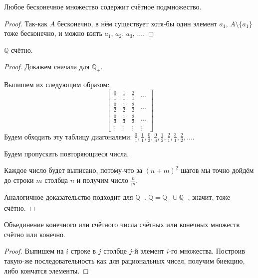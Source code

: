 \begin{lemma} \thmslashn

    Любое бесконечное множество содержит счётное подмножество.
    \begin{proof} \thmslashn
    
        Так-как $A$ бесконечно, в нём существует хотя-бы один элемент $a_1$, $A \setminus \{a_1\} $ тоже бесконечно, и можно взять $a_1$, $a_2$, $a_3$, $\ldots$. 
    \end{proof}
\end{lemma}
\begin{lemma} \thmslashn

    $\mathbb{Q}$ счётно.
    \begin{proof} \thmslashn
    
        Докажем сначала для $\mathbb{Q}_{+}$.

        Выпишем их следующим образом: \TODO
        \begin{equation*}
            \begin{bmatrix} 
                \frac{0}{1} & \frac{1}{1} & \frac{2}{1} & \ldots\\
                \frac{0}{2} & \frac{1}{2} & \frac{2}{2} & \ldots\\
                \frac{0}{3} & \frac{1}{3} & \frac{2}{3} & \ldots\\
                \vdots & \vdots & \vdots & \vdots
            \end{bmatrix} 
        \end{equation*}
        Будем обходить эту таблицу диагоналями: $\frac{0}{1}, \frac{1}{1}, \frac{0}{2}, \frac{0}{3}, \frac{1}{2}, \frac{2}{1}, \frac{3}{1}, \frac{2}{2}, \ldots$.

        Будем пропускать повторяющиеся числа.

        Каждое число будет выписано, потому-что за $(n+m)^2$ шагов мы точно дойдём до строки $m$ столбца $n$ и получим число $\frac{n}{m}$.

        Аналогичное доказательство подходит для $\mathbb{Q}_{-}$. $\mathbb{Q} = \mathbb{Q}_{+} \cup \mathbb{Q}_{-}$, значит, тоже счётно.
    \end{proof}
\end{lemma}
\begin{lemma} \thmslashn

    Объединение конечного или счётного числа счётных или конечных множеств счётно или конечно.
    \begin{proof} \thmslashn
    
        Выпишем на $i$ строке в $j$ столбце $j$-й элемент $i$-го множества. Построив такую-же последовательность как для рациональных чисел, получим биекцию, либо кончатся элементы.
    \end{proof}
\end{lemma}

